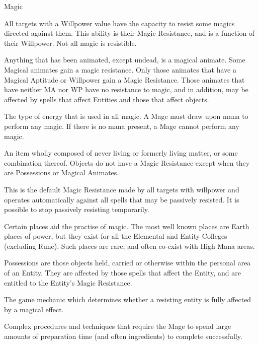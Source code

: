 \begin{Chapter}{Magic}
\begin{Description}
\item[Magic Resistance] All targets with a Willpower value have the
  capacity to resist some magics directed against them.  This ability
  is their Magic Resistance, and is a function of their Willpower.
  Not all magic is resistible.

\item[Magical Animates] Anything that has been animated, except
  undead, is a magical animate. Some Magical animates gain a magic
  resistance.  Only those animates that have a Magical Aptitude or
  Willpower gain a Magic Resistance.  Those animates that have
  neither MA nor WP have no resistance to magic, and in addition,
  may be affected by spells that affect Entities and those that affect
  objects.

\item[Mana] The type of energy that is used in all magic.  A Mage must
  draw upon mana to perform any magic.  If there is no mana present, a
  Mage cannot perform any magic.

\item[Object] An item wholly composed of never living or formerly
  living matter, or some combination thereof.  Objects do not have a
  Magic Resistance except when they are Possessions or Magical
  Animates.

\item[Passive Resistance] This is the default Magic Resistance made by
  all targets with willpower and operates automatically against all
  spells that may be passively resisted.  It is possible to stop
  passively resisting temporarily.

\item[Place of Power] Certain places aid the practise of magic.  The
  most well known places are Earth places of power, but they exist for
  all the Elemental and Entity Colleges (excluding Rune). Such places
  are rare, and often co-exist with High Mana areas.

\item[Possessions] Possessions are those objects held, carried or
  otherwise within the personal area of an Entity. They are affected
  by those spells that affect the Entity, and are entitled to the
  Entity’s Magic Resistance.

\item[Resistance Check] The game mechanic which determines whether a
  resisting entity is fully affected by a magical effect.

\item[Ritual Magic] Complex procedures and techniques that require the
  Mage to spend large amounts of preparation time (and often
  ingredients) to complete successfully.


\end{Description}
\end{Chapter}
